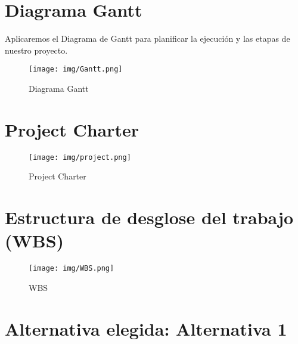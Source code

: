 \documentclass{article}
\begin{document}
\begin{doublespace}
\section{Diagrama Gantt}
    \noindent Aplicaremos el Diagrama de Gantt para planificar la ejecución y las etapas de nuestro proyecto.\\
    \begin{figure}[H]
        \centering
        \vspace*{1cm}
        \texttt{[image: img/Gantt.png]}
        \caption{Diagrama Gantt}
        \label{fig:Diagrama-gantt}
    \end{figure}

\section{Project Charter}

\begin{figure}[H]
    \centering
    \texttt{[image: img/project.png]}
    \caption{Project Charter}
    \label{fig:Project-Charter}
\end{figure}


\section{Estructura de desglose del trabajo (WBS)}

    \begin{figure}[H]
        \centering
        \vspace*{1cm}
        \texttt{[image: img/WBS.png]}
        \caption{WBS}
        \label{fig:WBS}
    \end{figure}

\section{Alternativa elegida: Alternativa 1}


\end{doublespace}
\end{document}
